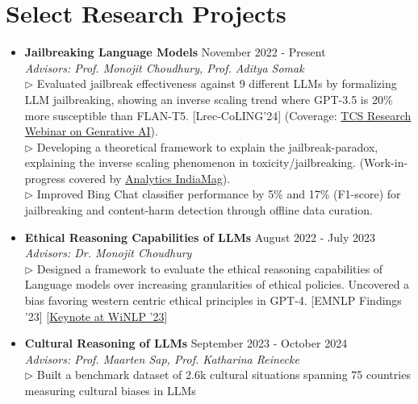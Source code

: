 \documentclass[11pt,letterpaper]{article}
\begin{document}
    \section*{Select Research Projects}
    \begin{itemize}[leftmargin=*,label={},itemsep=6pt]
        \item \textbf{Jailbreaking Language Models} \hfill November 2022 - Present\\
            \textit{Advisors: Prof. Monojit Choudhury, Prof. Aditya Somak}\\
            $\triangleright$ 
            Evaluated jailbreak effectiveness against 9 different LLMs by formalizing LLM jailbreaking, showing an inverse scaling trend where GPT-3.5 is 20\% more susceptible than FLAN-T5. [Lrec-CoLING'24] (Coverage: \href{https://www.linkedin.com/events/7086646211360821248/comments/}{TCS Research Webinar on Genrative AI}).
        \\
            $\triangleright$ 
            Developing a theoretical framework to explain the jailbreak-paradox, explaining the inverse scaling phenomenon in toxicity/jailbreaking. (Work-in-progress covered by \href{https://analyticsindiamag.com/ai-trends/now-jailbreakers-are-taking-over-indian-llms/}{Analytics IndiaMag}).
        \\
            $\triangleright$ 
            Improved Bing Chat classifier performance by 5\% and 17\% (F1-score) for jailbreaking and content-harm detection through offline data curation.
        \\
        \item \textbf{Ethical Reasoning Capabilities of LLMs} \hfill August 2022 - July 2023\\
            \textit{Advisors: Dr. Monojit Choudhury}\\
            $\triangleright$ 
            Designed a framework to evaluate the ethical reasoning capabilities of Language models over increasing granularities of ethical policies. Uncovered a bias favoring western centric ethical principles in GPT-4. [EMNLP Findings '23] [\href{https://2023.winlp.org/schedule/}{Keynote at WiNLP '23}]
        \\
        \item \textbf{Cultural Reasoning of LLMs} \hfill September 2023 - October 2024\\
            \textit{Advisors: Prof. Maarten Sap, Prof. Katharina Reinecke}\\
            $\triangleright$ 
            Built a benchmark dataset of 2.6k cultural situations spanning 75 countries measuring cultural biases in LLMs

\end{itemize}
\end{document}
